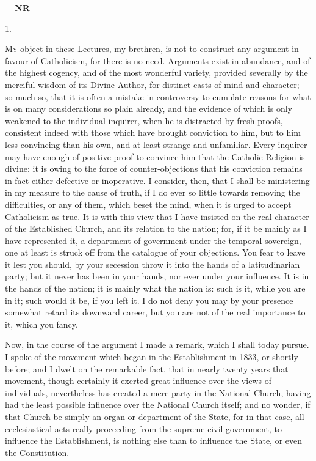 \textbf{—NR}

1.

M\textsc{y} object in these Lectures, my brethren, is not to construct any
argument in favour of Catholicism, for there is no need. Arguments
exist in abundance, and of the highest cogency, and of the most
wonderful variety, provided severally by the merciful wisdom of its
Divine Author, for distinct casts of mind and character;—so much so,
that it is often a mistake in controversy to cumulate reasons for what
is on many considerations so plain already, and the evidence of which
is only weakened to the individual inquirer, when he is distracted by
fresh proofs, consistent indeed with those which have brought
conviction to him, but to him less convincing than his own, and at
least strange and unfamiliar. Every inquirer may have enough of
positive proof to convince him that the Catholic Religion is divine:
it is owing to the force of counter-objections that his conviction
remains in fact either defective or inoperative. I consider, then,
that I shall be ministering in my measure to the cause of truth, if I
do ever so little towards removing the difficulties, or any of them,
which beset the mind, when it is urged to accept Catholicism as true.
It is with this view that I have insisted on the real character of the
Established Church, and its relation to the nation; for, if it be
mainly as I have represented it, a department of government under the
temporal sovereign, one at least is struck off from the catalogue of
your objections. You fear to leave it lest you should, by your
secession throw it into the hands of a latitudinarian party; but it
never has been in your hands, nor ever under your influence. It is in
the hands of the nation; it is mainly what the nation is: such is it,
while you are in it; such would it be, if you left it. I do not deny
you may by your presence somewhat retard its downward career, but you
are not of the real importance to it, which you fancy.

Now, in the course of the argument I made a remark, which I shall
today pursue. I spoke of the movement which began in the Establishment
in 1833, or shortly before; and I dwelt on the remarkable fact, that
in nearly twenty years that movement, though certainly it exerted
great influence over the views of individuals, nevertheless has
created a mere party in the National Church, having had the least
possible influence over the National Church itself; and no wonder, if
that Church be simply an organ or department of the State, for in that
case, all ecclesiastical acts really proceeding from the supreme civil
government, to influence the Establishment, is nothing else than to
influence the State, or even the Constitution.

